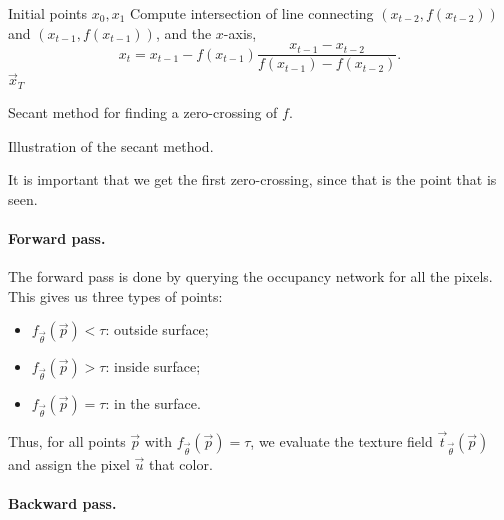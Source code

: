 \begin{algorithm}
    \begin{algorithmic}[1]
        \Require Initial points $x_0, x_1$
        \State Compute intersection of line connecting $(x_{t-2}, f(x_{t-2}))$ and $(x_{t-1}, f(x_{t-1}))$, and the $x$-axis, \[
            x_t = x_{t-1} - f(x_{t-1}) \frac{x_{t-1} - x_{t-2}}{f(x_{t-1}) - f(x_{t-2})}.
        \]
        \EndFor
        \State \Return $\vec{x}_T$
    \end{algorithmic}
    \caption{Secant method for finding a zero-crossing of $f$.}
    \label{alg:secant}
\end{algorithm}

\begin{marginfigure}
    \centering
    \caption{Illustration of the secant method.}
    \label{fig:secant-method}
\end{marginfigure}

It is important that we get the first zero-crossing, since that is the point that is seen.

\paragraph{Forward pass.}

The forward pass is done by querying the occupancy network for all the pixels. This gives us three
types of points:
\begin{itemize}
    \item $f_{\vec{\theta}}(\vec{p}) < \tau$: outside surface;
    \item $f_{\vec{\theta}}(\vec{p}) > \tau$: inside surface;
    \item $f_{\vec{\theta}}(\vec{p}) = \tau$: in the surface.
\end{itemize}
Thus, for all points $\vec{p}$ with $f_{\vec{\theta}}(\vec{p}) = \tau$, we evaluate the texture field
$\vec{t}_{\vec{\theta}}(\vec{p})$ and assign the pixel $\vec{u}$ that color.

\paragraph{Backward pass.}

